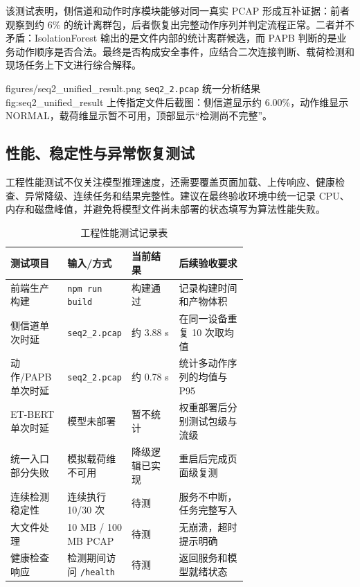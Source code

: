 该测试表明，侧信道和动作时序模块能够对同一真实 PCAP 形成互补证据：前者观察到约 6\% 的统计离群包，后者恢复出完整动作序列并判定流程正常。二者并不矛盾：IsolationForest 输出的是文件内部的统计离群候选，而 PAPB 判断的是业务动作顺序是否合法。最终是否构成安全事件，应结合二次连接判断、载荷检测和现场任务上下文进行综合解释。

\RobotSecFigure
  {figures/seq2_unified_result.png}
  {\texttt{seq2\_2.pcap} 统一分析结果}
  {fig:seq2_unified_result}
  {上传指定文件后截图：侧信道显示约 6.00\%，动作维显示 NORMAL，载荷维显示暂不可用，顶部显示“检测尚不完整”。}

\subsection{性能、稳定性与异常恢复测试}
\label{subsec:performance}

工程性能测试不仅关注模型推理速度，还需要覆盖页面加载、上传响应、健康检查、异常降级、连续任务和结果完整性。建议在最终验收环境中统一记录 CPU、内存和磁盘峰值，并避免将模型文件尚未部署的状态填写为算法性能失败。

\begin{table}[H]
\centering
\caption{工程性能测试记录表}
\label{tab:performance_record}
\small
\begin{tabularx}{\linewidth}{p{0.24\linewidth}p{0.24\linewidth}p{0.20\linewidth}X}
\toprule
\textbf{测试项目} & \textbf{输入/方式} & \textbf{当前结果} & \textbf{后续验收要求} \\
\midrule
前端生产构建 & \texttt{npm run build} & 构建通过 & 记录构建时间和产物体积 \\
侧信道单次时延 & \texttt{seq2\_2.pcap} & 约 3.88 s & 在同一设备重复 10 次取均值 \\
动作/PAPB 单次时延 & \texttt{seq2\_2.pcap} & 约 0.78 s & 统计多动作序列的均值与 P95 \\
ET-BERT 单次时延 & 模型未部署 & 暂不统计 & 权重部署后分别测试包级与流级 \\
统一入口部分失败 & 模拟载荷维不可用 & 降级逻辑已实现 & 重启后完成页面级复测 \\
连续检测稳定性 & 连续执行 10/30 次 & 待测 & 服务不中断，任务完整写入 \\
大文件处理 & 10 MB / 100 MB PCAP & 待测 & 无崩溃，超时提示明确 \\
健康检查响应 & 检测期间访问 \texttt{/health} & 待测 & 返回服务和模型就绪状态 \\
\bottomrule
\end{tabularx}
\end{table}

